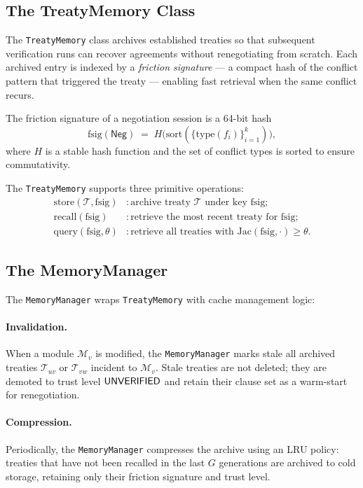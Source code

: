 \documentclass[11pt]{article}
\newcommand{\Trt}{\mathcal{T}}             %
\newcommand{\Neg}{\mathsf{Neg}}           %
\newcommand{\Mod}{\mathcal{M}}            %
\newcommand{\Recall}{\mathrm{recall}}     %
\newcommand{\Store}{\mathrm{store}}       %
\newcommand{\Query}{\mathrm{query}}       %
\newcommand{\Jaccard}{\mathrm{Jac}}       %
\begin{document}
\subsection{The TreatyMemory Class}

The \texttt{TreatyMemory} class archives established treaties so that
subsequent verification runs can recover agreements without
renegotiating from scratch.  Each archived entry is indexed by a
\emph{friction signature} — a compact hash of the conflict pattern
that triggered the treaty — enabling fast retrieval when the same
conflict recurs.

\begin{definition}\label{def:friction-sig}
The friction signature of a negotiation session is a 64-bit hash
\[
  \mathrm{fsig}(\Neg) \;=\;
  H\bigl(\mathrm{sort}(\{\mathrm{type}(f_i)\}_{i=1}^{k})\bigr),
\]
where $H$ is a stable hash function and the set of conflict types is
sorted to ensure commutativity.
\end{definition}

The \texttt{TreatyMemory} supports three primitive operations:
\begin{align*}
  \Store(\Trt, \mathrm{fsig}) &:
    \text{archive treaty } \Trt \text{ under key } \mathrm{fsig}; \\
  \Recall(\mathrm{fsig}) &:
    \text{retrieve the most recent treaty for } \mathrm{fsig}; \\
  \Query(\mathrm{fsig}, \theta) &:
    \text{retrieve all treaties with } \Jaccard(\mathrm{fsig}, \cdot) \geq \theta.
\end{align*}

\subsection{The MemoryManager}

The \texttt{MemoryManager} wraps \texttt{TreatyMemory} with cache
management logic:

\paragraph{Invalidation.}  When a module $\Mod_v$ is modified,
the \texttt{MemoryManager} marks stale all archived treaties
$\Trt_{uv}$ or $\Trt_{vw}$ incident to $\Mod_v$.  Stale treaties
are not deleted; they are demoted to trust level $\mathsf{UNVERIFIED}$ and
retain their clause set as a warm-start for renegotiation.

\paragraph{Compression.}  Periodically, the \texttt{MemoryManager}
compresses the archive using an LRU policy: treaties that have not
been recalled in the last $G$ generations are archived to cold
storage, retaining only their friction signature and trust level.
\end{document}
